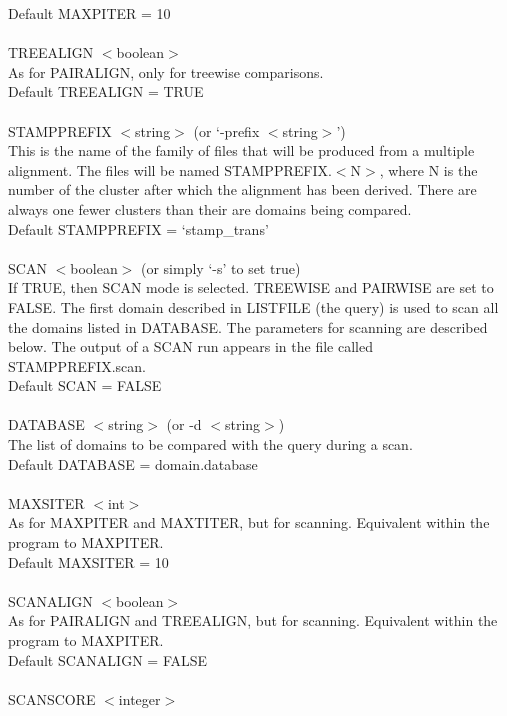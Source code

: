     Default MAXPITER = 10\\
    \\
    TREEALIGN $<$boolean$>$\\
    As for PAIRALIGN, only for treewise comparisons.\\
    Default TREEALIGN = TRUE\\
    \\
    STAMPPREFIX $<$string$>$ (or `-prefix $<$string$>$')\\
    This is the name of the family of files that will be produced from 
    a multiple alignment.  The files will be named STAMPPREFIX.$<$N$>$, 
    where N is the number of the cluster after which the alignment 
    has been derived.  There are always one fewer clusters than their 
    are domains being compared.\\
    Default STAMPPREFIX = `stamp\_trans'\\
    \\
    SCAN $<$boolean$>$ (or simply `-s' to set true) \\
    If TRUE, then SCAN mode is selected.  TREEWISE and PAIRWISE are set
    to FALSE.  The first domain described in LISTFILE (the query) is 
    used to scan all the domains listed in DATABASE.  The parameters 
    for scanning are described below.  The output of a SCAN run appears
    in the file called STAMPPREFIX.scan.\\
    Default SCAN = FALSE\\
    \\
    DATABASE $<$string$>$ (or -d $<$string$>$)\\
    The list of domains to be compared with the query during a scan.\\
    Default DATABASE = domain.database\\
    \\
    MAXSITER $<$int$>$\\
    As for MAXPITER and MAXTITER, but for scanning.  Equivalent
    within the program to MAXPITER.\\
    Default MAXSITER = 10\\
    \\
    SCANALIGN $<$boolean$>$\\
    As for PAIRALIGN and TREEALIGN, but for scanning.  Equivalent
    within the program to MAXPITER.\\
    Default SCANALIGN = FALSE\\
    \\
    SCANSCORE $<$integer$>$\\
